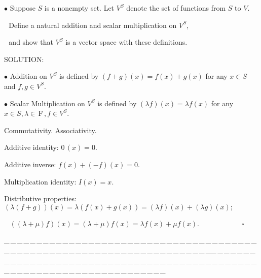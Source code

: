 \documentclass[a4paper, 11pt, UTF8]{article}
\def\Fbf{$\,{\timesbf F}\,$}
\begin{document}
\begin{large}
{\small $\bullet$} {\timessl\Large 
Suppose $S$ is a nonempty set. Let $V^S$ denote the set of functions from $S$ to $V$.}\par\,\,
{\timessl\Large Define a natural addition and scalar multiplication on $V^S$,}\par\,\,
{\timessl\Large and show that $V^S$ is a vector space with these definitions.}\par
{\timesbf S\footnotesize{OLUTION:}}\par\quad
{\tiny $\bullet$} Addition on $V^S$ is defined by $(f+g)(x)=f(x)+g(x)$ for any $x\in S$ and $f,g\in V^S$.\par\quad
{\tiny $\bullet$} Scalar Multiplication on $V^S$ is defined by $(\lambda f)(x)=\lambda f(x)$
 for any $x\in S,\lambda\in\Fbf,f\in V^S.$\par\quad
Commutativity. Associativity.\par\quad
Additive identity: $0\,(x)=0.$\par\quad
Additive inverse: $f(x)+(-f)(x)=0$.\par\quad
Multiplication identity: $I(x)=x$.\par\quad
Distributive properties: $(\lambda(f+g))(x)=\lambda(f(x)+g(x))=(\lambda f)(x)+(\lambda g)(x);$\par\qquad\qquad\qquad\qquad\qquad\,\,\,
$((\lambda+\mu)f)(x)=(\lambda+\mu)f(x)=\lambda f(x)+\mu f(x).\qquad\qquad\qquad\square$\par
{\tiny \_\,\_\,\_\,\_\,\_\,\_\,\_\,\_\,\_\,\_\,\_\,\_\,\_\,\_\,\_\,\_\,\_\,\_\,\_\,\_\,\_\,\_\,\_\,\_\,\_\,\_\,\_\,\_\,\_\,\_\,\_\,\_\,\_\,\_\,\_\,\_\,\_\,\_\,\_\,\_\,\_\,\_\,\_\,\_\,\_\,\_\,\_\,\_\,\_\,\_\,\_\,\_\,\_\,\_\,\_\,\_\,\_\,\_\,\_\,\_\,\_\,\_\,\_\,\_\,\_\,\_\,\_\,\_\,\_\,\_\,\_\_\,\_\,\_\,\_\,\_\,\_\,\_\,\_\,\_\,\_\,\_\,\_\,\_\,\_\,\_\,\_\,\_\,\_\,\_\,\_\,\_\,\_\,\_\,\_\,\_\,\_\,\_\,\_\,\_\,\_\,\_\,\_\,\_\,\_\,\_\,\_\,\_\,\_\,\_\,\_\,\_\,\_\,\_\,\_\,\_\,\_\,\_\,\_\,\_\,\_\,\_\,\_\,\_\,\_\,\_\,\_\,\_\,\_\,\_\,\_\,\_\,\_\,\_\,\_\,\_\,\_\,\_\,\_\,\_\,\_\,\_}{\tiny\,\par}


\end{large}
\end{document}

